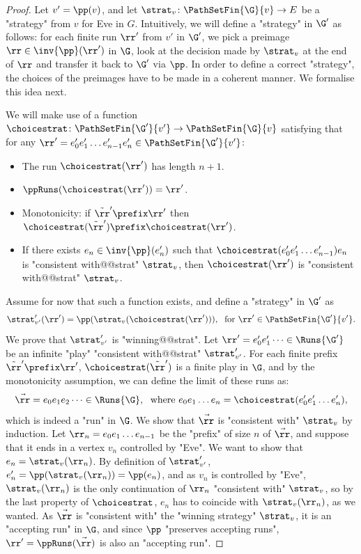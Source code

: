 \documentclass[10pt,a4paper]{amsart}
\begin{document}
\begin{proof}
	Let $v' = \pp(v)$, and let $\strat_v\colon \PathSetFin{\G}{v}\to E$ be a "strategy" from $v$ for Eve in $G$. 
	Intuitively, we will define a "strategy" in $\G'$ as follows: for each finite run $\rr'$ from $v'$ in $\G'$, we pick a preimage $\rr\in \inv{\pp}(\rr')$ in $\G$, look at the decision made by $\strat_v$ at the end of $\rr$ and transfer it back to $\G'$ via $\pp$. In order to define a correct "strategy", the choices of the preimages have to be made in a coherent manner. We formalise this idea next.
	
	We will make use of a function $\choicestrat \colon \PathSetFin{\G'}{v'} \to \PathSetFin{\G}{v}$ satisfying that for any $\rr' = e_0'e_1'\dots e_{n-1}'e_n'\in \PathSetFin{\G'}{v'}$:
	\begin{itemize}
		\item The run $\choicestrat(\rr')$ has length $n+1$.
		\item  $\ppRuns(\choicestrat(\rr')) = \rr'$.
		\item Monotonicity: if $\tilde{\rr}' \prefix \rr'$ then $\choicestrat(\tilde{\rr}') \prefix \choicestrat(\rr')$.
		\item If there exists $e_n\in \inv{\pp}(e_n')$ such that $\choicestrat(e_0'e_1'\dots e_{n-1}')e_n$ is "consistent with@@strat" $\strat_v$, then $\choicestrat(\rr')$ is "consistent with@@strat" $\strat_v$.
	\end{itemize}

Assume for now that such a function exists, and define a "strategy" in $\G'$ as \[\strat'_{v'}(\rr') = \pp(\strat_v(\choicestrat(\rr'))), \;\text{ for } \rr'\in \PathSetFin{\G'}{v'}.\] %
We prove that $\strat'_{v'}$ is "winning@@strat".
 Let $\rr' =e_0'e_1'\dots\in \Runs{\G'}$ be an infinite "play" "consistent with@@strat" $\strat'_{v'}$. For each finite prefix $\tilde{\rr}'\prefix \rr'$, $\choicestrat(\tilde{\rr}')$ is a finite play in $\G$, and by the monotonicity assumption, we can define the limit of these runs as:
\[ \vec{\rr} = e_0e_1e_2\dots \in \Runs{\G}, \;\text{ where } e_0e_1\dots e_n = \choicestrat(e_0'e_1'\dots e_n'),  \]
which is indeed a "run" in $\G$. We show that $\vec{\rr}$ is "consistent with" $\strat_v$ by induction. Let $\rr_n = e_0e_1\dots e_{n-1}$ be the "prefix" of size $n$ of $\vec{\rr}$, and suppose that it ends in a vertex $v_n$ controlled by "Eve". We want to show that $e_n = \strat_v(\rr_n)$. By definition of $\strat'_{v'}$, $e_n' = \pp(\strat_v(\rr_n)) = \pp(e_n)$, and as $v_n$ is controlled by "Eve", $\strat_v(\rr_n)$ is the only continuation of $\rr_n$ "consistent with" $\strat_v$, so by the last property of $\choicestrat$, $e_n$ has to coincide with $\strat_v(\rr_n)$, as we wanted. As $\vec{\rr}$ is "consistent with" the "winning strategy" $\strat_v$, it is an "accepting run" in $\G$, and since $\pp$ "preserves accepting runs", $\rr' = \ppRuns(\vec{\rr})$ is also an "accepting run". 


\end{proof}
\end{document}
